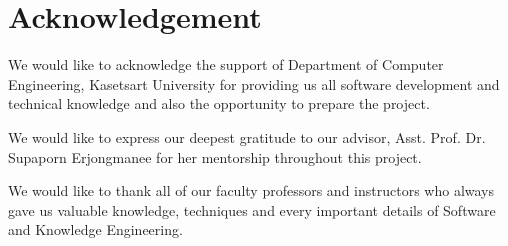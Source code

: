 \chapter*{Acknowledgement}
\label{chap:acknowledgement}

We would like to acknowledge the support of Department of Computer Engineering, Kasetsart University for providing us all
software development and technical knowledge and also the opportunity to prepare the project.

We would like to express our deepest gratitude to our advisor, Asst. Prof. Dr. Supaporn Erjongmanee for her mentorship throughout this project.

We would like to thank all of our faculty professors and instructors who always gave us valuable knowledge, techniques and
every important details of Software and Knowledge Engineering.

\vspace{.2in}
\begin{flushright}
    \usevar{\srsAuthorOne} \\
    \usevar{\srsAuthorTwo} \\
    \usevar{\srsAuthorThree}
\end{flushright}